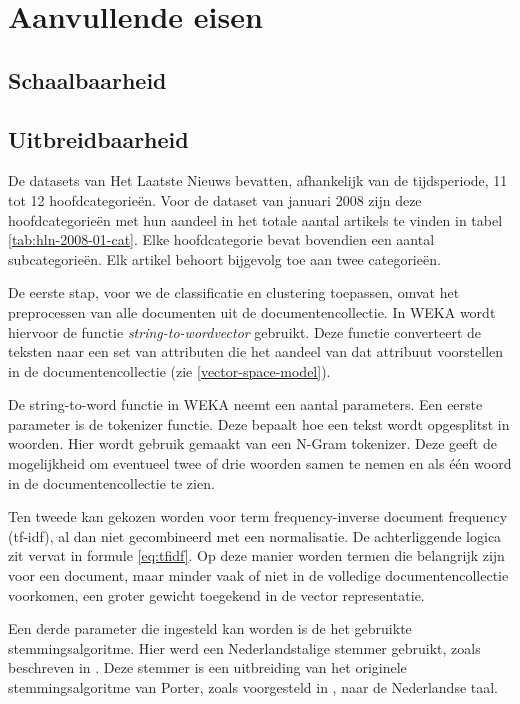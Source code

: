 \section{Aanvullende eisen}
\subsection{Schaalbaarheid}
\subsection{Uitbreidbaarheid}








\iffalse
De datasets van Het Laatste Nieuws bevatten, afhankelijk van de tijdsperiode, 11 tot 12 hoofdcategorie\"en. Voor de dataset van januari 2008 zijn deze hoofdcategorie\"en met hun aandeel in het totale aantal artikels te vinden in tabel \ref{tab:hln-2008-01-cat}. Elke hoofdcategorie bevat bovendien een aantal subcategorie\"en. Elk artikel behoort bijgevolg toe aan twee categorie\"en. 

De eerste stap, voor we de classificatie en clustering toepassen, omvat het preprocessen van alle documenten uit de documentencollectie. In WEKA wordt hiervoor de functie \textit{string-to-wordvector} gebruikt. Deze functie converteert de teksten naar een set van attributen die het aandeel van dat attribuut voorstellen in de documentencollectie (zie \ref{vector-space-model}). 

De string-to-word functie in WEKA neemt een aantal parameters. Een eerste parameter is de tokenizer functie. Deze bepaalt hoe een tekst wordt opgesplitst in woorden. Hier wordt gebruik gemaakt van een N-Gram tokenizer. Deze geeft de mogelijkheid om eventueel twee of drie woorden samen te nemen en als \'e\'en woord in de documentencollectie te zien.

Ten tweede kan gekozen worden voor term frequency-inverse document frequency (tf-idf), al dan niet gecombineerd met een normalisatie. De achterliggende logica zit vervat in formule \ref{eq:tfidf}. Op deze manier worden termen die belangrijk zijn voor een document, maar minder vaak of niet in de volledige documentencollectie voorkomen, een groter gewicht toegekend in de vector representatie. 

Een derde parameter die ingesteld kan worden is de het gebruikte stemmingsalgoritme. Hier werd een Nederlandstalige stemmer gebruikt, zoals beschreven in \cite{Kraaij1994}. Deze stemmer is een uitbreiding van het originele stemmingsalgoritme van Porter, zoals voorgesteld in \cite{Porter1980}, naar de Nederlandse taal. 

